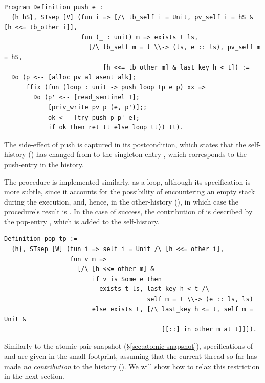 \begin{lstlisting}
Program Definition push e :   
  {h hS}, STsep [V] (fun i => [/\ tb_self i = Unit, pv_self i = hS & [h <<= tb_other i]],
                     fun (_ : unit) m => exists t ls, 
                       [/\ tb_self m = t \\-> (ls, e :: ls), pv_self m = hS,
                           [h <<= tb_other m] & last_key h < t]) := 
  Do (p <-- [alloc pv al asent alk];
      ffix (fun (loop : unit -> push_loop_tp e p) xx =>
        Do (p' <-- [read_sentinel T]; 
            [priv_write pv p (e, p')];;
            ok <-- [try_push p p' e];
            if ok then ret tt else loop tt)) tt).  
\end{lstlisting}
\label{lab:push}

The side-effect of push is captured in its postcondition, which states
that the self-history () has changed from  to
the singleton entry , which corresponds to
the push-entry in the history.

The  procedure is implemented similarly, as a loop, although
its specification is more subtle, since it accounts for the
possibility of encountering an empty stack during the execution, and,
hence, in the other-history (\code{[[::] in other m at t]}), in which
case the procedure's result  is . In the case of
success, the contribution of  is described by the pop-entry
, which is added to the self-history.

\begin{lstlisting}
Definition pop_tp := 
  {h}, STsep [W] (fun i => self i = Unit /\ [h <<= other i],
                  fun v m => 
                    [/\ [h <<= other m] &
                        if v is Some e then 
                          exists t ls, last_key h < t /\ 
                                       self m = t \\-> (e :: ls, ls)
                        else exists t, [/\ last_key h <= t, self m = Unit & 
                                           [[::] in other m at t]]]).  
\end{lstlisting}

Similarly to the atomic pair snapshot (\S\ref{sec:atomic-snapshot}),
specifications of \code{push} and \code{pop} are given in the small
footprint, assuming that the current thread so far has made \emph{no
  contribution} to the history (\code{tb_self i = Unit}). We will show
how to relax this restriction in the next section.

